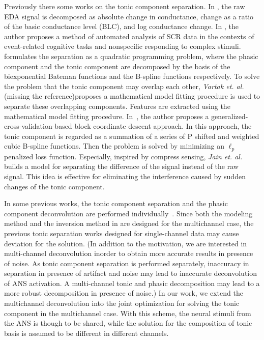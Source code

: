 \documentclass[10pt,conference]{ieeeconf}
\begin{document}
Previously there some works on the tonic component separation. In \cite{van1967skin}, the raw EDA signal is decomposed as absolute change in conductance, change as a ratio of the basic conductance level (BLC), and log conductance change. In \cite{green2014development}, the author proposes a method of automated analysis of SCR data in the contexts of event-related cognitive tasks and nonspecific responding to complex stimuli. \cite{greco2014electrodermal} formulates the separation as a quadratic programming problem, where the phasic component and the tonic component are decomposed by the basis of the biexponential Bateman functions and the B-spline functions respectively. To solve the problem that the tonic component may overlap each other, \textit{Vartak et. al.} {\color{red}(missing the reference)}proposes a mathematical model fitting procedure is used to separate these overlapping components. Features are extracted using the mathematical model fitting procedure. In~\cite{amin2019tonic}, the author proposes a generalized-cross-validation-based block coordinate descent approach. In this approach, the tonic component is regarded as a summation of a series of P shifted and weighted cubic B-spline functions. Then the problem is solved by minimizing an $\ell_p$ penalized loss function. Especially, inspired by compress sensing, \textit{Jain et. al.}~\cite{jain2016compressed} builds a model for separating the difference of the signal instead of the raw signal. This idea is effective for eliminating the interference caused by sudden changes of the tonic component.

In some previous works, the tonic component separation and the phasic component deconvolution are performed individually~\cite{greco2014electrodermal,amin2019robust}. Since both the modeling method and the inversion method in \cite{amin2019robust} are designed for the multichannel case, the previous tonic separation works designed for single-channel data may cause deviation for the solution. {\color{red} (In addition to the motivation, we are interested in multi-channel deconvolution inorder to obtain more accurate results in presence of noise. As tonic component separation is performed separately, inaccuracy in separation in presence of artifact and noise may lead to inaccurate deconvolution of ANS activation. A multi-channel tonic and phasic decomposition may lead to a more robust decomposition in presence of noise.)} In our work, we extend the multichannel deconvolution into the joint optimization for solving the tonic component in the multichannel case. With this scheme, the neural stimuli from the ANS is though to be shared, while the solution for the composition of tonic basis is assumed to be different in different channels.



\end{document}
